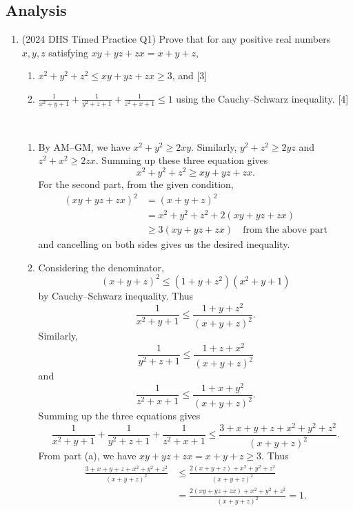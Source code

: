 \subsection{Analysis}
\begin{enumerate}
\item (2024 DHS Timed Practice Q1) Prove that for any positive real numbers $x,y,z$ satisfying $xy+yz+zx=x+y+z$,
\begin{enumerate}[label=(\alph*)]
\item $x^2+y^2+z^2\le xy+yz+zx\ge3$, and \hfill [3]
\item $\displaystyle\frac{1}{x^2+y+1}+\frac{1}{y^2+z+1}+\frac{1}{z^2+x+1}\le1$ using the Cauchy--Schwarz inequality. \hfill [4]
\end{enumerate}

\begin{solution} \
\begin{enumerate}[label=(\alph*)]
\item By AM--GM, we have $x^2+y^2\ge2xy$. Similarly, $y^2+z^2\ge2yz$ and $z^2+x^2\ge2zx$. Summing up these three equation gives
\[x^2+y^2+z^2\ge xy+yz+zx.\]
For the second part, from the given condition,
\begin{align*}
(xy+yz+zx)^2&=(x+y+z)^2\\
&=x^2+y^2+z^2+2(xy+yz+zx)\\
&\ge3(xy+yz+zx)\quad\text{from the above part}
\end{align*}
and cancelling on both sides gives us the desired inequality.

\item Considering the denominator,
\[(x+y+z)^2\le(1+y+z^2)(x^2+y+1)\]
by Cauchy--Schwarz inequality. Thus
\[\frac{1}{x^2+y+1}\le\frac{1+y+z^2}{(x+y+z)^2}.\]
Similarly,
\[\frac{1}{y^2+z+1}\le\frac{1+z+x^2}{(x+y+z)^2}\]
and
\[\frac{1}{z^2+x+1}\le\frac{1+x+y^2}{(x+y+z)^2}.\]
Summing up the three equations gives
\[\frac{1}{x^2+y+1}+\frac{1}{y^2+z+1}+\frac{1}{z^2+x+1}\le\frac{3+x+y+z+x^2+y^2+z^2}{(x+y+z)^2}.\]
From part (a), we have $xy+yz+zx=x+y+z\ge3$.
Thus
\begin{align*}
\frac{3+x+y+z+x^2+y^2+z^2}{(x+y+z)^2}
&\le\frac{2(x+y+z)+x^2+y^2+z^2}{(x+y+z)^2}\\
&=\frac{2(xy+yz+zx)+x^2+y^2+z^2}{(x+y+z)^2}=1.
\end{align*}
\end{enumerate}
\end{solution}
\end{enumerate}

